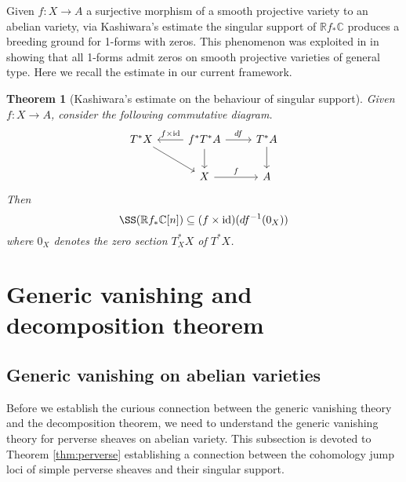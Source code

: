 \documentclass[12pt,reqno]{amsart}
\newtheorem{theorem}{Theorem}
\theoremstyle{question}
\theoremstyle{definition}
\theoremstyle{remark}
\theoremstyle{cited}
\theoremstyle{citeddef}
\DeclareMathOperator{\id}{id}                    %
\DeclareMathOperator{\Char}{Char}
\newcommand{\sP}{\mathcal{P}}
\newcommand\sV{{\mathcal V}}
\newcommand{\bbC}{\mathbb{C}}
\newcommand{\bbR}{\mathbb{R}}
\begin{document}
Given $f\colon X\to A$ a surjective morphism of a smooth projective variety to an abelian
variety, via Kashiwara's estimate the singular support of $\bbR f_*\bbC$ produces a breeding ground for 1-forms with zeros. This phenomenon was exploited in
\cite{PS14}
in showing that all 1-forms admit zeros on smooth projective
varieties of general type. Here we recall the estimate in our
current framework. 
\begin{theorem}[Kashiwara's estimate on the behaviour of singular support]
Given $f\colon X\to A$, consider the following commutative diagram.
\[
\begin{tikzcd}
T^*X \ar[dr]& f^*T^*A \ar[d]\ar[r, "df"]\ar[l, "f\times\id"'] & T^*A\ar[d]\\
&X\ar[r, "f"] &A
\end{tikzcd}
\]
Then 
\[\SS(\bbR f_* \bbC[n]) \subseteq (f\times \id)(df^{-1}(0_X))\]
where $0_X$ denotes the zero section $T^*_XX$ of $T^*X$.

\label{thm:}
\end{theorem}












\section{Generic vanishing and decomposition theorem}

\subsection{Generic vanishing on abelian varieties}
Before we establish the curious connection between the generic vanishing theory and the decomposition theorem, we need to understand
the generic vanishing theory for perverse sheaves on abelian variety. This subsection is devoted to
 Theorem \ref{thm:perverse} establishing a connection between the cohomology jump loci of simple perverse sheaves and their singular support.
%
\end{document}

